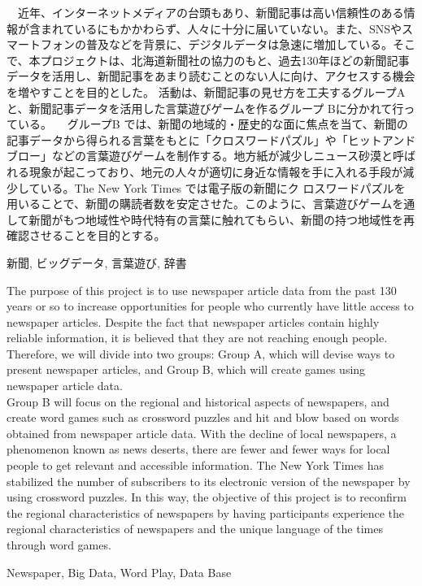 \documentclass[openany, 11pt,papersize,dvipdfm]{jsbook}
\begin{document}
%
\maketitle

\frontmatter

\begin{jabstract}
　近年、インターネットメディアの台頭もあり、新聞記事は高い信頼性のある情報が含まれているにもかかわらず、人々に十分に届いていない。また、SNSやスマートフォンの普及などを背景に、デジタルデータは急速に増加している。そこで、本プロジェクトは、北海道新聞社の協力のもと、過去130年ほどの新聞記事データを活用し、新聞記事をあまり読むことのない人に向け、アクセスする機会を増やすことを目的とした。
活動は、新聞記事の見せ方を工夫するグループAと、新聞記事データを活用した言葉遊びゲームを作るグループ Bに分かれて行っている。
　グループB では、新聞の地域的・歴史的な面に焦点を当て、新聞の記事データから得られる言葉をもとに「クロスワードパズル」や「ヒットアンドブロー」などの言葉遊びゲームを制作する。地方紙が減少しニュース砂漠と呼ばれる現象が起こっており、地元の人々が適切に身近な情報を手に入れる手段が減少している。The New York Times では電子版の新聞にク
ロスワードパズルを用いることで、新聞の購読者数を安定させた。このように、言葉遊びゲームを通して新聞がもつ地域性や時代特有の言葉に触れてもらい、新聞の持つ地域性を再確認させることを目的とする。
\begin{jkeyword}
新聞, ビッグデータ, 言葉遊び, 辞書
\end{jkeyword}
\end{jabstract}

\begin{eabstract} The purpose of this project is to use newspaper article data from the past 130 years or so to increase opportunities for people who
currently have little access to newspaper articles. Despite the fact that newspaper articles contain highly reliable information, it is
believed that they are not reaching enough people. Therefore, we will divide into two groups: Group A, which will devise ways to
present newspaper articles, and Group B, which will create games using newspaper article data.\\
Group B will focus on the regional and historical aspects of newspapers, and create word games such as crossword puzzles and hit and blow based on words obtained from newspaper article data. With the decline of local newspapers, a phenomenon known as news deserts, there are fewer and fewer ways for local people to get relevant and accessible information. The New York Times has stabilized the number of subscribers to its electronic version of the newspaper by using crossword puzzles. In this way, the objective of this project is to reconfirm the regional characteristics of newspapers by having participants experience the regional characteristics of newspapers and the unique language of the times through word games.
\begin{ekeyword}
Newspaper, Big Data, Word Play, Data Base
\end{ekeyword}
\end{eabstract}
\end{document}
